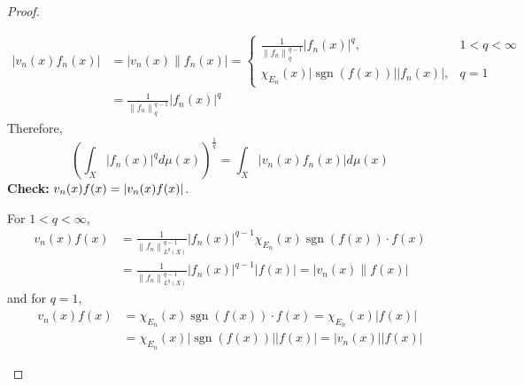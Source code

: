 \begin{proof}
\begin{enumerate}[label=(\roman*)]
\begin{equation*}
			\begin{aligned}
				\left|v_n(x) f_n(x)\right| & =\left|v_n(x) \| f_n(x)\right|= \begin{cases}\frac{1}{\left\|f_n\right\|_{q}^{q-1}}\left|f_n(x)\right|^q, & 1<q < \infty \\
				\chi_{E_n}(x)|\operatorname{sgn}(f(x))|\left|f_n(x)\right|, & q=1\end{cases} \\
				& =\frac{1}{\left\|f_n\right\|_{q}^{q-1}}\left|f_n(x)\right|^q
			\end{aligned}
		\end{equation*}
		Therefore,
		\begin{equation*}
			\left(\int_X\left|f_n(x)\right|^q d \mu(x)\right)^{\frac{1}{q}}=\int_X\left|v_n(x) f_n(x)\right| d \mu(x)
		\end{equation*}
		\textbf{Check:} $v_n(x)f(x) = \left\lvert v_n(x)f(x)\right\lvert$.

		\noindent For $1 < q < \infty$,
		\begin{equation*}
			\begin{aligned}
				v_n(x) f(x) & =\frac{1}{\left\|f_n\right\|_{L^q(X)}^{q-1}}\left|f_n(x)\right|^{q-1} \chi_{E_n}(x) \operatorname{sgn}(f(x)) \cdot f(x) \\
				& =\frac{1}{\left\|f_n\right\|_{L^q(X)}^{q-1}}\left|f_n(x)\right|^{q-1}|f(x)|=\left|v_n(x) \| f(x)\right|
			\end{aligned}
		\end{equation*}
		and for $q = 1$,
		\begin{equation*}
			\begin{aligned}
				v_n(x) f(x) & =\chi_{E_n}(x) \operatorname{sgn}(f(x)) \cdot f(x)=\chi_{E_n}(x)|f(x)| \\
				& =\chi_{E_n}(x)|\operatorname{sgn}(f(x))||f(x)|=\left|v_n(x)\right||f(x)|
			\end{aligned}
		\end{equation*}


\end{enumerate}
\end{proof}
